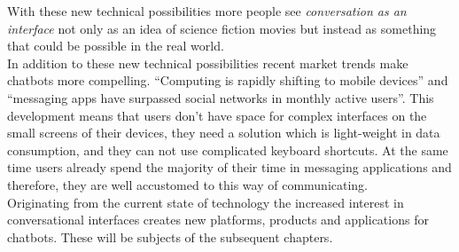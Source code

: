With these new technical possibilities more people see \emph{conversation as an interface} not only as an idea of science fiction movies but instead as something that could be possible in the real world.
\\

In addition to these new technical possibilities recent market trends make chatbots more compelling. ``Computing is rapidly shifting to mobile devices''\cite{mobileusage} and ``messaging apps have surpassed social networks in monthly active users''\cite{convtrends}. This development means that users don't have space for complex interfaces on the small screens of their devices, they need a solution which is light-weight in data consumption, and they can not use complicated keyboard shortcuts. At the same time users already spend the majority of their time in messaging applications and therefore, they are well accustomed to this way of communicating.
\\

Originating from the current state of technology the increased interest in conversational interfaces creates new platforms, products and applications for chatbots. These will be subjects of the subsequent chapters.



